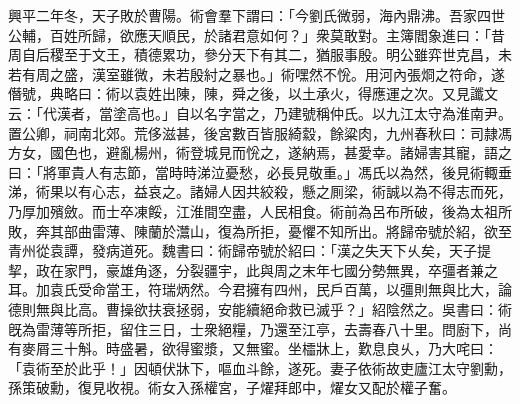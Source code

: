 \begin{pinyinscope}
興平二年冬，天子敗於曹陽。術會羣下謂曰：「今劉氏微弱，海內鼎沸。吾家四世公輔，百姓所歸，欲應天順民，於諸君意如何？」衆莫敢對。主簿閻象進曰：「昔周自后稷至于文王，積德累功，參分天下有其二，猶服事殷。明公雖弈世克昌，未若有周之盛，漢室雖微，未若殷紂之暴也。」術嘿然不恱。用河內張烱之符命，遂僭號，典略曰：術以袁姓出陳，陳，舜之後，以土承火，得應運之次。又見讖文云：「代漢者，當塗高也。」自以名字當之，乃建號稱仲氏。以九江太守為淮南尹。置公卿，祠南北郊。荒侈滋甚，後宮數百皆服綺縠，餘粱肉，九州春秋曰：司隷馮方女，國色也，避亂楊州，術登城見而恱之，遂納焉，甚愛幸。諸婦害其寵，語之曰：「將軍貴人有志節，當時時涕泣憂愁，必長見敬重。」馮氏以為然，後見術輙垂涕，術果以有心志，益哀之。諸婦人因共絞殺，懸之厠梁，術誠以為不得志而死，乃厚加殯斂。而士卒凍餒，江淮間空盡，人民相食。術前為呂布所破，後為太祖所敗，奔其部曲雷薄、陳蘭於灊山，復為所拒，憂懼不知所出。將歸帝號於紹，欲至青州從袁譚，發病道死。魏書曰：術歸帝號於紹曰：「漢之失天下乆矣，天子提挈，政在家門，豪雄角逐，分裂疆宇，此與周之末年七國分勢無異，卒彊者兼之耳。加袁氏受命當王，符瑞炳然。今君擁有四州，民戶百萬，以彊則無與比大，論德則無與比高。曹操欲扶衰拯弱，安能續絕命救已滅乎？」紹陰然之。吳書曰：術旣為雷薄等所拒，留住三日，士衆絕糧，乃還至江亭，去壽春八十里。問廚下，尚有麥屑三十斛。時盛暑，欲得蜜漿，又無蜜。坐櫺牀上，歎息良乆，乃大咤曰：「袁術至於此乎！」因頓伏牀下，嘔血斗餘，遂死。妻子依術故吏廬江太守劉勳，孫策破勳，復見收視。術女入孫權宮，子燿拜郎中，燿女又配於權子奮。


\end{pinyinscope}